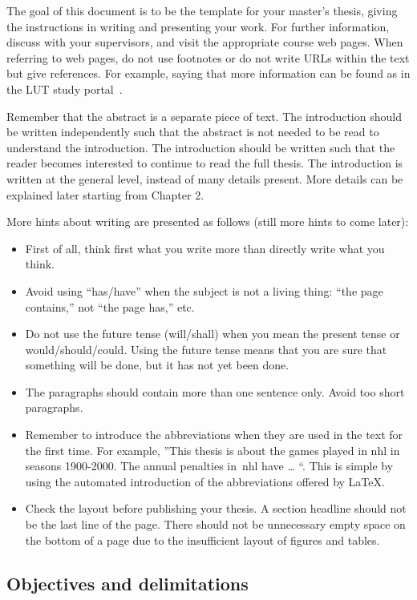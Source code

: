 \documentclass{lutmscthesis}[2017/10/03]
\begin{document}
The goal of this document is to be the template for your master's thesis, giving the instructions in writing and presenting your work. 
For further information, discuss with your supervisors, and visit the appropriate course web pages. 
When referring to web pages, do not use footnotes or do not write URLs within the text but give references. 
For example, saying that more information can be found as in the LUT study portal~\cite{lutstudyportal}.

Remember that the abstract is a separate piece of text. 
The introduction should be written independently such that the abstract is not needed to be read to understand the introduction. 
The introduction should be written such that the reader becomes interested to continue to read the full thesis. 
The introduction is written at the general level, instead of many details present. 
More details can be explained later starting from Chapter 2. 

More hints about writing are presented as follows (still more hints to come later): 
\vspace{-18pt}
\begin{itemize}
\itemsep=-3pt
\item First of all, think first what you write more than directly write what you think. 
\item Avoid using “has/have” when the subject is not a living thing: “the page contains,” not “the page has,” etc. 
\item Do not use the future tense (will/shall) when you mean the present tense or would/should/could. Using the future tense means that you are sure that something will be done, but it has not yet been done. 
\item The paragraphs should contain more than one sentence only. Avoid too short paragraphs. 
\item Remember to introduce the abbreviations when they are used in the text for the first time. For example, ”This thesis is about the games played in \gls{nhl} in seasons 1900-2000. The annual penalties in~\gls{nhl} have … “. 
This is simple by using the automated introduction of the abbreviations offered by LaTeX. 
\item Check the layout before publishing your thesis. A section headline should not be the last line of the page. There should not be unnecessary empty space on the bottom of a page due to the insufficient layout of figures and tables.
\end{itemize}


\subsection{Objectives and delimitations}
\label{sec:objectives}
\end{document}

